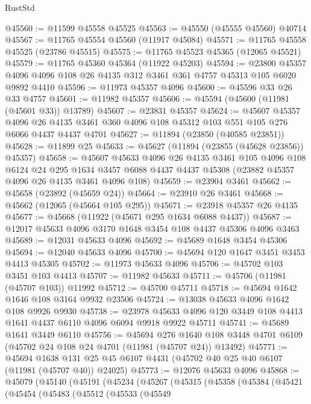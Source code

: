 \begin{lexlean}{RustStd}
\begin{coremodule}
@45560 := @11599 @45558 @45525
@45563 := @45550 (@45555 @45560) @40714
@45567 := @11765 @45554 @45560 (@11917 @45084)
@45571 := @11765 @45558 @45525 (@23786 @45515)
@45575 := @11765 @45523 @45365 (@12065 @45521)
@45579 := @11765 @45360 @45364 (@11922 @45203)
@45594 := @23800
    @45357
    @4096
    @4096
    @108
    @26
    @4135
    @312
    @3461
    @361
    @4757
    @45313
    @105
    @6020
    @9892
    @4410
@45596 := @11973 @45357 @4096
@45600 := @45596 @33 @26 @33 @4757
@45601 := @11982 @45357
@45606 := @45594 (@45600 (@11981 (@45601 @33)) @13789)
@45607 := @23831 @45357
@45624 := @45607
    @45357
    @4096
    @26
    @4135
    @3461
    @360
    @4096
    @108
    @45312
    @103
    @551
    @105
    @276
    @6066
    @4437
    @4437
    @4701
@45627 := @11894 (@23850 (@40585 @23851))
@45628 := @11899 @25
@45633 := @45627 (@11894 (@23855 (@45628 @23856)) @45357)
@45658 := @45607
    @45633
    @4096
    @26
    @4135
    @3461
    @105
    @4096
    @108
    @6124
    @24
    @295
    @1634
    @3457
    @6088
    @4437
    @4437
    @45308
    (@23882 @45357 @4096 @26 @4135 @3461 @4096 @108)
@45659 := @23904 @3461
@45662 := @45658 (@23892 (@45659 @24))
@45664 := @23910 @26 @3461
@45668 := @45662 (@12065 (@45664 @105 @295))
@45671 := @23918 @45357 @26 @4135
@45677 := @45668 (@11922 (@45671 @295 @1634 @6088 @4437))
@45687 := @12017 @45633 @4096 @3170 @1648 @3454 @108 @4437 @45306 @4096 @3463
@45689 := @12031 @45633 @4096
@45692 := @45689 @1648 @3454 @45306
@45694 := @12040 @45633 @4096
@45700 := @45694 @120 @1647 @3451 @3453 @4413 @45305
@45702 := @11973 @45633 @4096
@45706 := @45702 @103 @3451 @103 @4413
@45707 := @11982 @45633
@45711 := @45706 (@11981 (@45707 @103)) @11992
@45712 := @45700 @45711
@45718 := @45694 @1642 @1646 @108 @3164 @9932 @23506
@45724 := @13038 @45633 @4096 @1642 @108 @9926 @9930
@45738 := @23978 @45633 @4096 @120 @3449 @108 @4413 @1641 @4437 @6110 @4096 @6094 @9918 @9922 @45711
@45741 := @45689 @1641 @3449 @6110
@45756 := @45694
    @276
    @1640
    @108
    @3448
    @4701
    @6109
    (@45702 @24 @108 @24 @4701 (@11981 (@45707 @24)) @13492)
@45771 := @45694
    @1638
    @131
    @25
    @45
    @6107
    @4431
    (@45702 @40 @25 @40 @6107 (@11981 (@45707 @40)) @24025)
@45773 := @12076 @45633 @4096
@45868 := @45079
    (@45140
      (@45191
        (@45234
          (@45267
            (@45315
              (@45358
                (@45384
                  (@45421
                    (@45454
                      (@45483
                        (@45512
                          (@45533
                            (@45549

\end{coremodule}
\end{lexlean}
